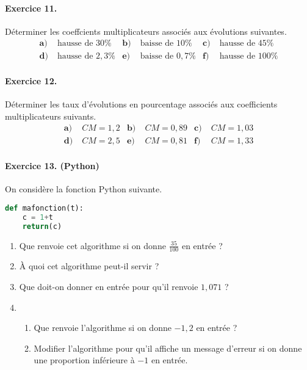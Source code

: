 \documentclass[11pt]{article}
\begin{document}
\paragraph{Exercice 11.}
Déterminer les coeffcients multiplicateurs associés aux évolutions suivantes.
\begin{align*}
  \textbf{a)}\;& \text{hausse de } 30\% &
  \textbf{b)}\;& \text{baisse de } 10\% &
  \textbf{c)}\;& \text{hausse de } 45\% \\
  \textbf{d)}\;& \text{hausse de } 2,3\% &
  \textbf{e)}\;& \text{baisse de } 0,7\% &
  \textbf{f)}\;& \text{hausse de } 100\%
\end{align*}

\paragraph{Exercice 12.}
Déterminer les taux d'évolutions en pourcentage associés aux coefficients
multiplicateurs suivants.
\begin{align*}
  \textbf{a)}\;& CM=1,2 &
  \textbf{b)}\;& CM = 0,89 &
  \textbf{c)}\;& CM = 1,03 \\
  \textbf{d)}\;& CM = 2,5 &
  \textbf{e)}\;& CM = 0,81 &
  \textbf{f)}\;& CM = 1,33
\end{align*}

\paragraph{Exercice 13. (Python)}
On considère la fonction Python suivante.

\begin{lstlisting}[language=Python]
def mafonction(t):
    c = 1+t
    return(c)
\end{lstlisting}
\begin{enumerate}
  \item Que renvoie cet algorithme si on donne $\frac{35}{100}$ en entrée ?
  \item À quoi cet algorithme peut-il servir ?
  \item Que doit-on donner en entrée pour qu'il renvoie $1,071$ ?
  \item \begin{enumerate}
      \item Que renvoie l'algorithme si on donne $-1,2$ en entrée ?
      \item Modifier l'algorithme pour qu'il affiche un message d'erreur si on
        donne une proportion inférieure à $-1$ en entrée.
    \end{enumerate}
\end{enumerate}
\end{document}
